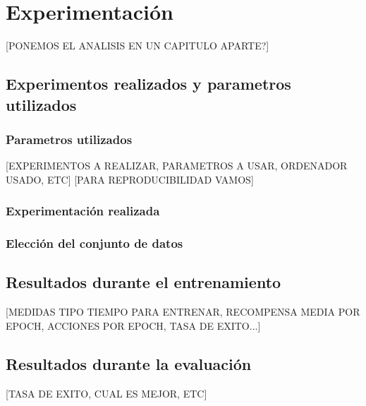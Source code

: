 \chapter{Experimentación}

[PONEMOS EL ANALISIS EN UN CAPITULO APARTE?]

\section{Experimentos realizados y parametros utilizados}

\subsection{Parametros utilizados}
[EXPERIMENTOS A REALIZAR, PARAMETROS A USAR, ORDENADOR USADO, ETC]
[PARA REPRODUCIBILIDAD VAMOS]

\subsection{Experimentación realizada}

\subsection{Elección del conjunto de datos}

\section{Resultados durante el entrenamiento}
[MEDIDAS TIPO TIEMPO PARA ENTRENAR, RECOMPENSA MEDIA POR EPOCH, ACCIONES POR EPOCH, TASA DE EXITO...]


\section{Resultados durante la evaluación}
[TASA DE EXITO, CUAL ES MEJOR, ETC]